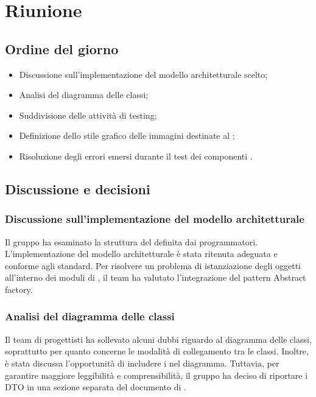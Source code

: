\section{Riunione}
\subsection{Ordine del giorno}
\begin{itemize}
	\item Discussione sull'implementazione del modello architetturale scelto;
	\item Analisi del diagramma delle classi;
	\item Suddivisione delle attività di testing;
	\item Definizione dello stile grafico delle immagini destinate al \MU;
	\item Risoluzione degli errori emersi durante il test dei componenti .
\end{itemize}

\subsection{Discussione e decisioni}
\subsubsection{Discussione sull'implementazione del modello architetturale}
\par Il gruppo ha esaminato la struttura del  definita dai programmatori. L'implementazione del modello architetturale è stata ritenuta adeguata e conforme agli standard. Per risolvere un problema di istanziazione degli oggetti all'interno dei moduli di , il team ha valutato l'integrazione del pattern Abstract factory.

\subsubsection{Analisi del diagramma delle classi}
\par Il team di progettisti ha sollevato alcuni dubbi riguardo al diagramma delle classi, soprattutto per quanto concerne le modalità di collegamento tra le classi. Inoltre, è stata discussa l'opportunità di includere i  nel diagramma. Tuttavia, per garantire maggiore leggibilità e comprensibilità, il gruppo ha deciso di riportare i DTO in una sezione separata del documento di \ST.

